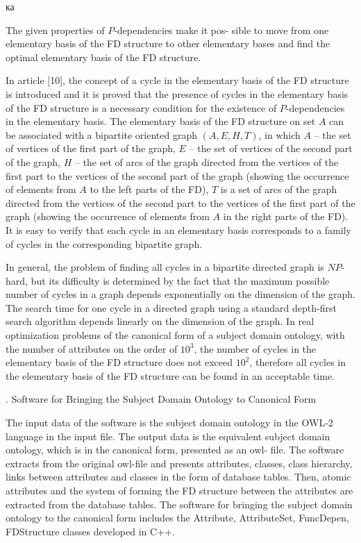 ка\documentclass[times]{article}
\newcommand{\RomanNumeralCaps}[1]
    {\MakeUppercase{\romannumeral #1}}
\begin{document}
The given properties of $P$-dependencies make it pos- sible to move from one elementary basis of the FD structure to other elementary bases and find the optimal elementary basis of the FD structure.

In article [10], the concept of a cycle in the elementary basis of the FD structure is introduced and it is proved that the presence of cycles in the elementary basis of the FD structure is a necessary condition for the existence of $P$-dependencies in the elementary basis. The elementary basis of the FD structure on set $A$ can be associated with a bipartite oriented graph $(A, E, H, T )$, in which $A$ – the set of vertices of the first part of the graph, $E$ – the set of vertices of the second part of the graph, $H$ – the set of arcs of the graph directed from the vertices of the first part to the vertices of the second part of the graph (showing the occurrence of elements from $A$ to the left parts of the FD), $T$ is a set of arcs of the graph directed from the vertices of the second part to the vertices of the first part of the graph (showing the occurrence of elements from $A$ in the right parts of the FD). It is easy to verify that each cycle in an elementary basis corresponds to a family of cycles in the corresponding bipartite graph.

In general, the problem of finding all cycles in a bipartite directed graph is $N P$-hard, but its difficulty is determined by the fact that the maximum possible number of cycles in a graph depends exponentially on the dimension of the graph. The search time for one cycle in a directed graph using a standard depth-first search algorithm depends linearly on the dimension of the graph. In real optimization problems of the canonical form of a subject domain ontology, with the number of attributes on the order of $10^3$, the number of cycles in the elementary basis of the FD structure does not exceed $10^2$, therefore all cycles in the elementary basis of the FD structure can be found in an acceptable time.

\begin{center}
    \RomanNumeralCaps{6}. Software for Bringing the Subject Domain Ontology to Canonical Form
\end{center}

The input data of the software is the subject domain ontology in the OWL-2 language in the input file. The output data is the equivalent subject domain ontology, which is in the canonical form, presented as an owl- file. The software extracts from the original owl-file and presents attributes, classes, class hierarchy, links between attributes and classes in the form of database tables. Then, atomic attributes and the system of forming the FD structure between the attributes are extracted from the database tables. The software for bringing the subject domain ontology to the canonical form includes the Attribute, AttributeSet, FuncDepen, FDStructure classes developed in C++.
\end{document}
